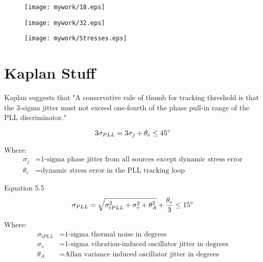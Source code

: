 \begin{figure}[!htb] 
    \centering
    \texttt{[image: mywork/18.eps]} 
    \caption{}
\end{figure}

\begin{figure}[!htb] 
    \centering
    \texttt{[image: mywork/32.eps]} 
    \caption{}
\end{figure}


\begin{figure}[!htb] 
    \centering
    \texttt{[image: mywork/Stresses.eps]} 
    \caption{}
\end{figure}





\section{Kaplan Stuff}
Kaplan suggests that "A conservative rule of thumb for tracking threshold is that the 3-sigma jitter must not exceed one-fourth of the phase pull-in range of the PLL discriminator." %

\begin{equation}
3 \sigma_{PLL} = 3 \sigma_j +\theta_e \leq 45 \degree
\end{equation}

Where:
\begin{align*}
\sigma_j &= \text{1-sigma phase jitter from all sources except dynamic stress error} \\
\theta_e &= \text{dynamic stress error in the PLL tracking loop}
\end{align*}



Equation 5.5
\begin{equation}
\sigma_{PLL} = \sqrt{\sigma^2_{tPLL} + \sigma^2_v+ \theta^2_A} + \frac{\theta_e}{3} \leq 15 \degree 
\end{equation}

Where:
\begin{align*}
\sigma_{tPLL} &= \text{1-sigma thermal noise in degrees}\\
\sigma_v &= \text{1-sigma vibration-induced oscillator jitter in degrees}\\
\theta_A &= \text{Allan variance induced oscillator jitter in degrees}
\end{align*}



